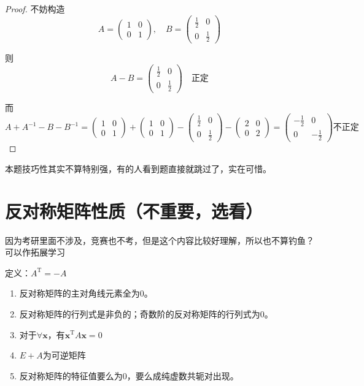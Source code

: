 \begin{proof}
不妨构造
\[ A= \begin{pmatrix}1&0\\0&1\end{pmatrix} , \quad 
B=\begin{pmatrix}\frac{1}{2}&0\\0&\frac{1}{2}\end{pmatrix} \]

则\[ A-B = \begin{pmatrix}\frac{1}{2}&0\\0&\frac{1}{2}\end{pmatrix} \quad \text{正定} \]

而\[ A + A^{-1} - B - B^{-1} = \begin{pmatrix}1&0\\0&1\end{pmatrix} + \begin{pmatrix}1&0\\0&1\end{pmatrix} - \begin{pmatrix}\frac{1}{2}&0\\0&\frac{1}{2}\end{pmatrix} - \begin{pmatrix}2&0\\0&2\end{pmatrix} = \begin{pmatrix}-\frac{1}{2}&0\\0&-\frac{1}{2}\end{pmatrix} \text{不正定} \]
\end{proof}

\begin{remark}
本题技巧性其实不算特别强，有的人看到题直接就跳过了，实在可惜。
\end{remark}

\section{反对称矩阵性质（不重要，选看）}
因为考研里面不涉及，竞赛也不考，但是这个内容比较好理解，所以也不算钓鱼？可以作拓展学习
\begin{lemma}[反对称矩阵基本性质]
定义：$ A^\mathrm{T} = -A $
\begin{enumerate}[label=性质~\arabic*]
\item 反对称矩阵的主对角线元素全为0。
\item 反对称矩阵的行列式是非负的；奇数阶的反对称矩阵的行列式为0。
\item 对于$\forall \boldsymbol{x} $，有$ \boldsymbol{x} ^\mathrm{T} A \boldsymbol{x} = 0 $
\item $E+A$为可逆矩阵
\item 反对称矩阵的特征值要么为0，要么成纯虚数共轭对出现。
\end{enumerate}

        
\end{lemma}

